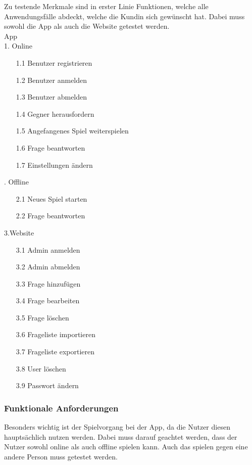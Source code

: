 \documentclass[fontsize=12pt,paper=a4,twoside]{scrartcl}
\begin{document}
Zu testende Merkmale sind in erster Linie Funktionen, welche alle Anwendungsfälle abdeckt, welche die Kundin sich gewünscht hat. Dabei muss sowohl die App als auch die Website getestet werden.\\
App\\
1. Online\\
\begin{itemize}
\item[1.1]Benutzer registrieren
\item[1.2]Benutzer anmelden 
\item[1.3]Benutzer abmelden 
\item[1.4]Gegner herausfordern
\item[1.5]Angefangenes Spiel weiterspielen
\item[1.6]Frage beantworten 
\item[1.7]Einstellungen ändern
\end{itemize}
. Offline\\
\begin{itemize}
\item[2.1]Neues Spiel starten
\item[2.2]Frage beantworten
\end{itemize}
\bigskip
3.Website\\
\begin{itemize}
\item[3.1]Admin anmelden
\item[3.2]Admin abmelden
\item[3.3]Frage hinzufügen
\item[3.4]Frage bearbeiten
\item[3.5]Frage löschen
\item[3.6]Frageliste importieren
\item[3.7]Frageliste exportieren
\item[3.8]User löschen
\item[3.9]Passwort ändern
\end{itemize}
\bigskip


\subsubsection{Funktionale Anforderungen} 
Besonders wichtig ist der Spielvorgang bei der App, da die Nutzer diesen hauptsächlich nutzen werden. Dabei muss darauf geachtet werden, dass der Nutzer sowohl online als auch offline spielen kann. Auch das spielen gegen eine andere Person muss getestet werden.\\
\end{document}
